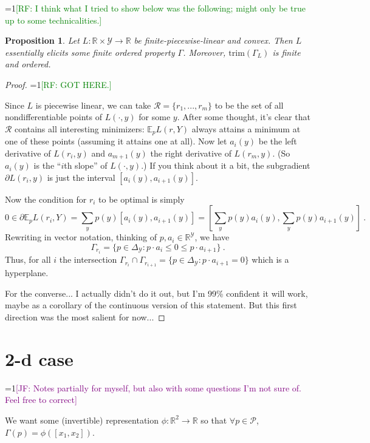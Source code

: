 \documentclass[12pt]{article}
\newcommand{\Comments}{1}
\newcommand{\mynote}[2]{\ifnum\Comments=1\textcolor{#1}{#2}\fi}
\newcommand{\raf}[1]{\mynote{green}{[RF: #1]}}
\newcommand{\jessie}[1]{\mynote{purple}{[JF: #1]}}
\newcommand{\reals}{\mathbb{R}}
\newcommand{\E}{\mathbb{E}}
\renewcommand{\P}{\mathcal{P}}
\newcommand{\R}{\mathcal{R}}
\newcommand{\Y}{\mathcal{Y}}
\renewcommand{\P}{\mathcal{P}}
\newcommand{\trim}{\mathrm{trim}}
\newtheorem{proposition}{Proposition}
\begin{document}
\raf{I think what I tried to show below was the following; might only be true up to some technicalities.}
\begin{proposition}
  Let $L : \reals \times \Y \to \reals$ be finite-piecewise-linear and convex.
  Then $L$ essentially elicits some finite ordered property $\Gamma$.
  Moreover, $\trim(\Gamma_L)$ is finite and ordered.
\end{proposition}
\begin{proof}
\raf{GOT HERE.}

Since $L$ is piecewise linear, we can take $\R = \{r_1,...,r_m\}$ to be the set of all nondifferentiable points of $L(\cdot,y)$ for some $y$.
After some thought, it's clear that $\R$ contains all interesting minimizers: $\E_p L(r,Y)$ always attains a minimum at one of these points (assuming it attains one at all).
Now let $a_i(y)$ be the left derivative of $L(r_i,y)$ and $a_{m+1}(y)$ the right derivative of $L(r_m,y)$.
(So $a_i(y)$ is the ``$i$th slope'' of $L(\cdot,y)$.)
If you think about it a bit, the subgradient $\partial L(r_i,y)$ is just the interval $[a_i(y), a_{i+1}(y)]$.

Now the condition for $r_i$ to be optimal is simply
\begin{equation*}\label{eq:1}
0 \in \partial \E_p L(r_i,Y) = \sum_y p(y) [a_i(y), a_{i+1}(y)] = \left[\sum_y p(y) a_i(y), \sum_y p(y) a_{i+1}(y)\right]~.
\end{equation*}
Rewriting in vector notation, thinking of $p,a_i \in \reals^\Y$, we have
\begin{equation*}\label{eq:1}
\Gamma_{r_i} = \{ p \in \Delta_\Y : p\cdot a_i \leq 0 \leq p\cdot a_{i+1} \}~.
\end{equation*}
Thus, for all $i$ the intersection $\Gamma_{r_i} \cap \Gamma_{r_{i+1}} = \{ p \in \Delta_\Y : p\cdot a_{i+1} = 0\}$ which is a hyperplane.

For the converse... I actually didn't do it out, but I'm 99\% confident it will work, maybe as a corollary of the continuous version of this statement.
But this first direction was the most salient for now...
\end{proof}



\section{2-d case}
\jessie{Notes partially for myself, but also with some questions I'm not sure of.  Feel free to correct}

We want some (invertible) representation $\phi: \reals^2 \to \reals$ so that $\forall p \in \P$, $\Gamma(p) = \phi([ x_1, x_2 ])$.
\end{document}
